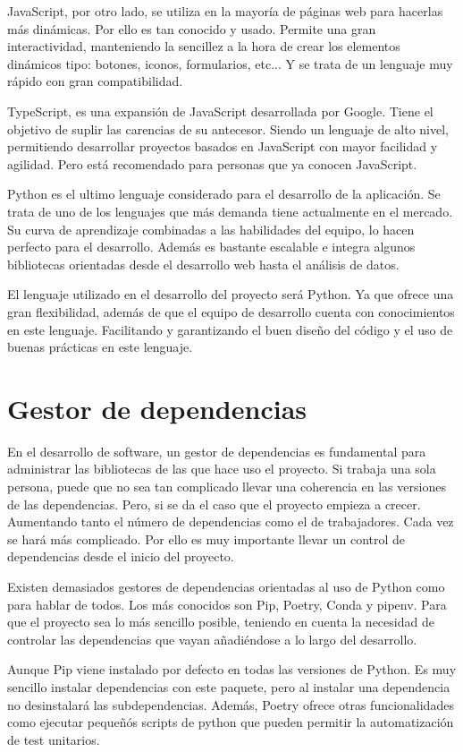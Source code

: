 JavaScript, por otro lado, se utiliza en la mayoría de páginas web para hacerlas más dinámicas. Por ello es tan conocido y usado. Permite una gran interactividad, manteniendo la sencillez a la hora de crear los elementos dinámicos tipo: botones, iconos, formularios, etc... Y se trata de un lenguaje muy rápido con gran compatibilidad.

TypeScript, es una expansión de JavaScript desarrollada por Google. Tiene el objetivo de suplir las carencias de su antecesor. Siendo un lenguaje de alto nivel, permitiendo desarrollar proyectos basados en JavaScript con mayor facilidad y agilidad. Pero está recomendado para personas que ya conocen JavaScript.

Python es el ultimo lenguaje considerado para el desarrollo de la aplicación. Se trata de uno de los lenguajes que más demanda tiene actualmente en el mercado. Su curva de aprendizaje combinadas a las habilidades del equipo, lo hacen perfecto para el desarrollo. Además es bastante escalable e integra algunos bibliotecas orientadas desde el desarrollo web hasta el análisis de datos.

El lenguaje utilizado en el desarrollo del proyecto será Python. Ya que ofrece una gran flexibilidad, además de que el equipo de desarrollo cuenta con conocimientos en este lenguaje. Facilitando y garantizando el buen diseño del código y el uso de buenas prácticas en este lenguaje.

\section{Gestor de dependencias}
En el desarrollo de software, un gestor de dependencias es fundamental para administrar las bibliotecas de las que hace uso el proyecto. Si trabaja una sola persona, puede que no sea tan complicado llevar una coherencia en las versiones de las dependencias. Pero, si se da el caso que el proyecto empieza a crecer. Aumentando tanto el número de dependencias como el de trabajadores. Cada vez se hará más complicado. Por ello es muy importante llevar un control de dependencias desde el inicio del proyecto.

Existen demasiados gestores de dependencias orientadas al uso de Python como para hablar de todos. Los más conocidos son Pip, Poetry, Conda y pipenv. Para que el proyecto sea lo más sencillo posible, teniendo en cuenta la necesidad de controlar las dependencias que vayan añadiéndose a lo largo del desarrollo. 

Aunque Pip viene instalado por defecto en todas las versiones de Python. Es muy sencillo instalar dependencias con este paquete, pero al instalar una dependencia no desinstalará las subdependencias. Además, Poetry ofrece otras funcionalidades como ejecutar pequeñós scripts de python que pueden permitir la automatización de test unitarios.

